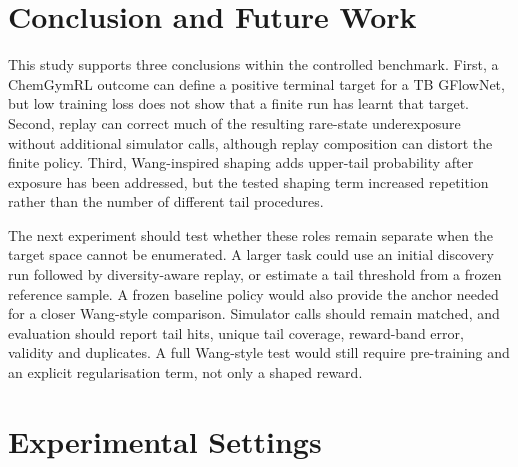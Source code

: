 \documentclass{article}
\begin{document}
\section{Conclusion and Future Work}

This study supports three conclusions within the controlled benchmark. First, a ChemGymRL outcome can define a positive terminal target for a TB GFlowNet, but low training loss does not show that a finite run has learnt that target. Second, replay can correct much of the resulting rare-state underexposure without additional simulator calls, although replay composition can distort the finite policy. Third, Wang-inspired shaping adds upper-tail probability after exposure has been addressed, but the tested shaping term increased repetition rather than the number of different tail procedures.

The next experiment should test whether these roles remain separate when the target space cannot be enumerated. A larger task could use an initial discovery run followed by diversity-aware replay, or estimate a tail threshold from a frozen reference sample. A frozen baseline policy would also provide the anchor needed for a closer Wang-style comparison. Simulator calls should remain matched, and evaluation should report tail hits, unique tail coverage, reward-band error, validity and duplicates. A full Wang-style test would still require pre-training and an explicit regularisation term, not only a shaped reward.

\appendix

\section{Experimental Settings}
\label{app:settings}
\end{document}
